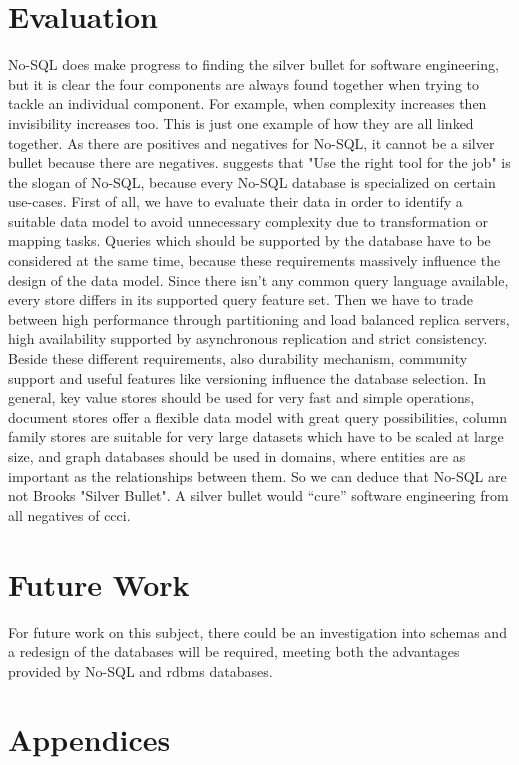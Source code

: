 \documentclass{article} %
\begin{document}
\section{Evaluation}

No-SQL does make progress to finding the silver bullet for software engineering, but it is clear the four components are always found together when trying to 
tackle an individual component. For example,  when complexity increases then invisibility increases too. 
This is just one example of how they are all linked together. As there are positives 
and negatives for No-SQL, it cannot be a silver bullet because there are negatives. 
\cite{hecht2011nosql} suggests that "Use the right tool for the job" is  the slogan of
 No-SQL, because every No-SQL database is
specialized on certain use-cases.
First of all, we have to evaluate their data in order to
identify a suitable data model to avoid unnecessary complexity
due to transformation or mapping tasks. Queries which should
be supported by the database have to be considered at the same
time, because these requirements massively influence the
design of the data model. Since there isn't any common query language
available, every store differs in its supported query feature set.
Then we have to trade between high
performance through partitioning and load balanced replica
servers, high availability supported by asynchronous
replication and strict consistency. Beside these
different requirements, also durability mechanism, community
support and useful features like versioning influence the
database selection. In general, key value stores should be used
for very fast and simple operations, document stores offer a
flexible data model with great query possibilities, column
family stores are suitable for very large datasets which have to
be scaled at large size, and graph databases should be used in
domains, where entities are as important as the relationships
between them. So we can deduce that No-SQL are not Brooks
"Silver Bullet".
A silver bullet would “cure” software engineering from all negatives of \acrshort{ccci}. 


\section{Future Work}

For future work on this subject, there could be an investigation into schemas
and a redesign of the databases will be required, meeting both
the advantages provided by No-SQL and \acrshort{rdbms} databases.









\clearpage

\section{Appendices}


\printglossary[type=\acronymtype,title=Acronyms]
\end{document}
